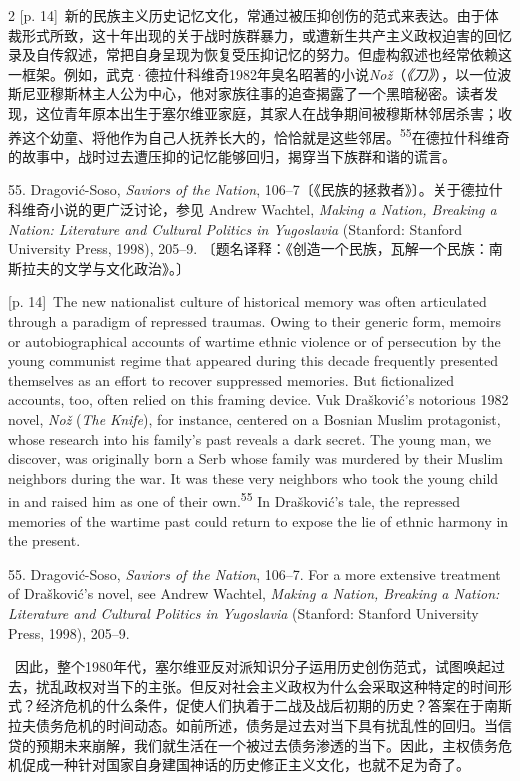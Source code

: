 \documentclass[10pt,a4paper]{article}
\begin{document}
\begin{paracol}{2}
{\scriptsize\color{gray} [p. 14]}\ 新的民族主义历史记忆文化，常通过被压抑创伤的范式来表达。由于体裁形式所致，这十年出现的关于战时族群暴力，或遭新生共产主义政权迫害的回忆录及自传叙述，常把自身呈现为恢复受压抑记忆的努力。但虚构叙述也经常依赖这一框架。例如，武克·德拉什科维奇1982年臭名昭著的小说\textit{Nož}（\textit{《刀》}），以一位波斯尼亚穆斯林主人公为中心，他对家族往事的追查揭露了一个黑暗秘密。读者发现，这位青年原本出生于塞尔维亚家庭，其家人在战争期间被穆斯林邻居杀害；收养这个幼童、将他作为自己人抚养长大的，恰恰就是这些邻\mbox{居。\textsuperscript{55}}在德拉什科维奇的故事中，战时过去遭压抑的记忆能够回归，揭穿当下族群和谐的谎言。\par{\small 55. Dragović-Soso, \textit{Saviors of the Nation}, 106–7〔《民族的拯救者》〕。关于德拉什科维奇小说的更广泛讨论，参见 Andrew Wachtel, \textit{Making a Nation, Breaking a Nation: Literature and Cultural Politics in Yugoslavia} (Stanford: Stanford University Press, 1998), 205–9. 〔题名译释：《创造一个民族，瓦解一个民族：南斯拉夫的文学与文化政治》。〕\par}
\switchcolumn
{\scriptsize\color{gray} [p. 14]}\ The new nationalist culture of historical memory was often articulated through a paradigm of repressed traumas. Owing to their generic form, memoirs or autobiographical accounts of wartime ethnic violence or of persecution by the young communist regime that appeared during this decade frequently presented themselves as an effort to recover suppressed memories. But fictionalized accounts, too, often relied on this framing device. Vuk Drašković’s notorious 1982 novel, \textit{Nož} (\textit{The Knife}), for instance, centered on a Bosnian Muslim protagonist, whose research into his family’s past reveals a dark secret. The young man, we discover, was originally born a Serb whose family was murdered by their Muslim neighbors during the war. It was these very neighbors who took the young child in and raised him as one of their own.\nobreak\textsuperscript{55} In Drašković’s tale, the repressed memories of the wartime past could return to expose the lie of ethnic harmony in the present.\par{\small 55. Dragović-Soso, \textit{Saviors of the Nation}, 106–7. For a more extensive treatment of Drašković’s novel, see Andrew Wachtel, \textit{Making a Nation, Breaking a Nation: Literature and Cultural Politics in Yugoslavia} (Stanford: Stanford University Press, 1998), 205–9.\par}
\switchcolumn*
{\scriptsize\color{gray} [p. 15]}\ 因此，整个1980年代，塞尔维亚反对派知识分子运用历史创伤范式，试图唤起过去，扰乱政权对当下的主张。但反对社会主义政权为什么会采取这种特定的时间形式？经济危机的什么条件，促使人们执着于二战及战后初期的历史？答案在于南斯拉夫债务危机的时间动态。如前所述，债务是过去对当下具有扰乱性的回归。当信贷的预期未来崩解，我们就生活在一个被过去债务渗透的当下。因此，主权债务危机促成一种针对国家自身建国神话的历史修正主义文化，也就不足为奇了。\par

\end{paracol}
\end{document}
